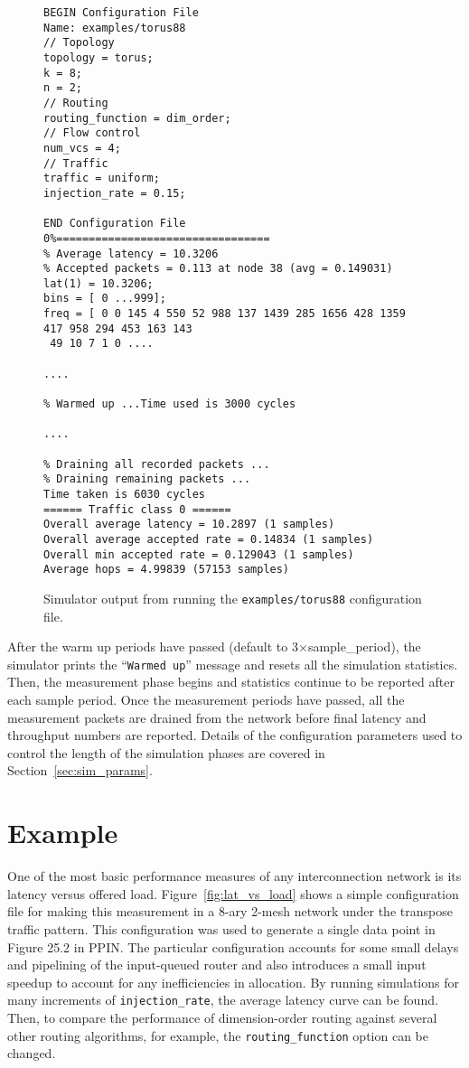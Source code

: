 \documentclass[11pt]{article}
\begin{document}
\begin{figure}
\begin{verbatim}
BEGIN Configuration File
Name: examples/torus88
// Topology
topology = torus;
k = 8;
n = 2;
// Routing
routing_function = dim_order;
// Flow control
num_vcs = 4;
// Traffic
traffic = uniform;
injection_rate = 0.15;

END Configuration File
0%=================================
% Average latency = 10.3206
% Accepted packets = 0.113 at node 38 (avg = 0.149031)
lat(1) = 10.3206;
bins = [ 0 ...999];
freq = [ 0 0 145 4 550 52 988 137 1439 285 1656 428 1359 417 958 294 453 163 143
 49 10 7 1 0 ....

....

% Warmed up ...Time used is 3000 cycles

....

% Draining all recorded packets ...
% Draining remaining packets ...
Time taken is 6030 cycles
====== Traffic class 0 ======
Overall average latency = 10.2897 (1 samples)
Overall average accepted rate = 0.14834 (1 samples)
Overall min accepted rate = 0.129043 (1 samples)
Average hops = 4.99839 (57153 samples)
\end{verbatim}
\caption{Simulator output from running the \texttt{examples/torus88}
configuration file.}
\label{fig:sim_output}
\end{figure}

After the warm up periods have passed (default to 3$\times$sample\_period), the simulator prints the
``\texttt{Warmed up}'' message and resets all the simulation statistics.
Then, the measurement phase begins and statistics continue to be
reported after each sample period.  Once the measurement periods have
passed, all the measurement packets are drained from the network
before final latency and throughput numbers are reported.  Details of
the configuration parameters used to control the length of the
simulation phases are covered in Section~\ref{sec:sim_params}.

\section{Example}
\label{sec:examples}

One of the most basic performance measures of any interconnection
network is its latency versus offered load.
Figure~\ref{fig:lat_vs_load} shows a simple configuration file for
making this measurement in a 8-ary 2-mesh network under the transpose
traffic pattern.  This configuration was used to generate a single data point in Figure 25.2
in PPIN.  The particular configuration accounts for some small delays
and pipelining of the input-queued router and also introduces a small
input speedup to account for any inefficiencies in allocation.  By
running simulations for many increments of \texttt{injection\_rate},
the average latency curve can be found.  Then, to compare the
performance of dimension-order routing against several other routing
algorithms, for example, the \texttt{routing\_function} option can be
changed.
\end{document}
